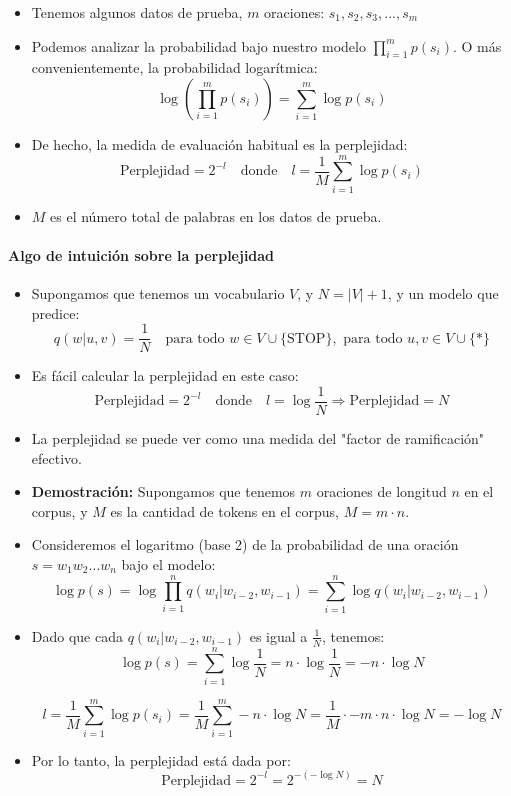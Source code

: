 \begin{itemize}
    \item Tenemos algunos datos de prueba, $m$ oraciones: $s_1, s_2, s_3, ..., s_m$
    \item Podemos analizar la probabilidad bajo nuestro modelo $\prod_{i=1}^{m} p(s_i)$. O más convenientemente, la probabilidad logarítmica:
    \[
        \log \left( \prod_{i=1}^{m} p(s_i) \right) = \sum_{i=1}^{m} \log p(s_i)
    \]
    \item De hecho, la medida de evaluación habitual es la perplejidad:
    \[
        \text{Perplejidad} = 2^{-l} \quad \text{donde} \quad l = \frac{1}{M} \sum_{i=1}^{m} \log p(s_i)
    \]
    \item $M$ es el número total de palabras en los datos de prueba.
\end{itemize}

\paragraph{Algo de intuición sobre la perplejidad}

\begin{itemize}
    \item Supongamos que tenemos un vocabulario $V$, y $N = |V| + 1$, y un modelo que predice:
    \[
        q(w|u, v) = \frac{1}{N} \quad \text{para todo } w \in V \cup \{\text{STOP}\}, \text{ para todo } u, v \in V \cup \{*\}
    \]
    \item Es fácil calcular la perplejidad en este caso:
    \[
        \text{Perplejidad} = 2^{-l} \quad \text{donde} \quad l = \log \frac{1}{N} \Rightarrow \text{Perplejidad} = N
    \]
    \item La perplejidad se puede ver como una medida del "factor de ramificación" efectivo.
    
    \item \textbf{Demostración:} Supongamos que tenemos $m$ oraciones de longitud $n$ en el corpus, y $M$ es la cantidad de tokens en el corpus, $M = m \cdot n$.
    
    \item Consideremos el logaritmo (base 2) de la probabilidad de una oración $s = w_1 w_2 \dots w_n$ bajo el modelo:
    \[
        \log p(s) = \log \prod_{i=1}^{n} q(w_i|w_{i-2}, w_{i-1}) = \sum_{i=1}^{n} \log q(w_i|w_{i-2}, w_{i-1})
    \]
    \item Dado que cada $q(w_i|w_{i-2}, w_{i-1})$ es igual a $\frac{1}{N}$, tenemos:
    \[
        \log p(s) = \sum_{i=1}^{n} \log \frac{1}{N} = n \cdot \log \frac{1}{N} = -n \cdot \log N
    \]
    
    
    \[
        l =  \frac{1}{M} \sum_{i=1}^{m} \log p(s_i) = \frac{1}{M} \sum_{i=1}^{m} -n \cdot \log N  = \frac{1}{M} \cdot -m \cdot n \cdot \log N = - \log N 
    \]
    
            
    \item Por lo tanto, la perplejidad está dada por:
    \[
        \text{Perplejidad} = 2^{-l} = 2^{-(- \log N)} = N
    \]
\end{itemize}



